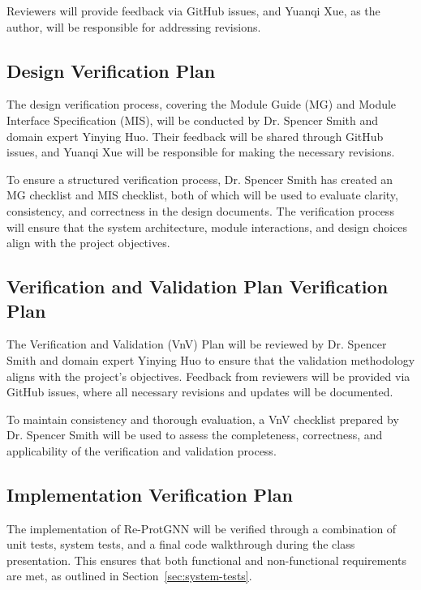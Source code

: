 \documentclass[12pt, titlepage]{article}
\begin{document}
Reviewers will provide feedback via GitHub issues, and Yuanqi Xue, as the author, will be responsible for addressing revisions.

\subsection{Design Verification Plan}
\label{sec:dvp}
The design verification process, covering the Module Guide (MG) and Module Interface Specification (MIS), will be conducted by Dr. Spencer Smith and domain expert Yinying Huo. Their feedback will be shared through GitHub issues, and Yuanqi Xue will be responsible for making the necessary revisions.

To ensure a structured verification process, Dr. Spencer Smith has created an MG checklist and MIS checklist, both of which will be used to evaluate clarity, consistency, and correctness in the design documents. The verification process will ensure that the system architecture, module interactions, and design choices align with the project objectives.

\subsection{Verification and Validation Plan Verification Plan}
\label{sec:vvp}
The Verification and Validation (VnV) Plan will be reviewed by Dr. Spencer Smith and domain expert Yinying Huo to ensure that the validation methodology aligns with the project’s objectives. Feedback from reviewers will be provided via GitHub issues, where all necessary revisions and updates will be documented.

To maintain consistency and thorough evaluation, a VnV checklist prepared by Dr. Spencer Smith will be used to assess the completeness, correctness, and applicability of the verification and validation process. 


\subsection{Implementation Verification Plan}
\label{sec:ivp}

The implementation of Re-ProtGNN will be verified through a combination of unit tests, system tests, and a final code walkthrough during the class presentation. This ensures that both functional and non-functional requirements are met, as outlined in Section~\ref{sec:system-tests}.
\end{document}
